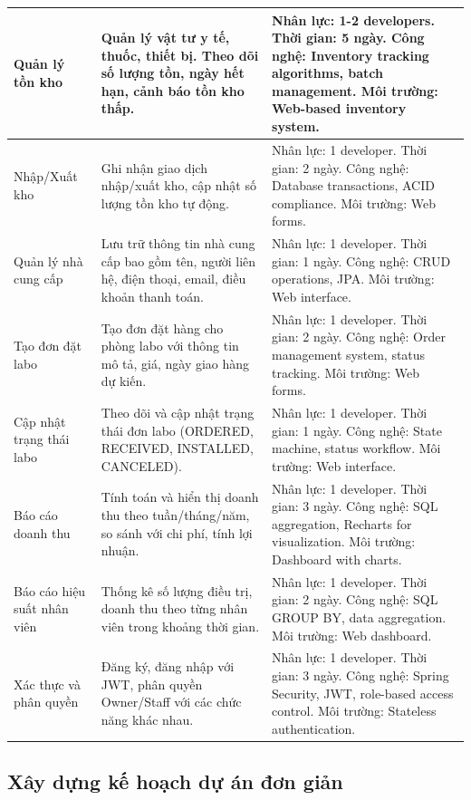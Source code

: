\begin{table}[h]
\begin{tabular}{|p{3.5cm}|p{5cm}|p{5cm}|}
\hline
Quản lý tồn kho & Quản lý vật tư y tế, thuốc, thiết bị. Theo dõi số lượng tồn, ngày hết hạn, cảnh báo tồn kho thấp. & Nhân lực: 1-2 developers. Thời gian: 5 ngày. Công nghệ: Inventory tracking algorithms, batch management. Môi trường: Web-based inventory system. \\
\hline
Nhập/Xuất kho & Ghi nhận giao dịch nhập/xuất kho, cập nhật số lượng tồn kho tự động. & Nhân lực: 1 developer. Thời gian: 2 ngày. Công nghệ: Database transactions, ACID compliance. Môi trường: Web forms. \\
\hline
Quản lý nhà cung cấp & Lưu trữ thông tin nhà cung cấp bao gồm tên, người liên hệ, điện thoại, email, điều khoản thanh toán. & Nhân lực: 1 developer. Thời gian: 1 ngày. Công nghệ: CRUD operations, JPA. Môi trường: Web interface. \\
\hline
Tạo đơn đặt labo & Tạo đơn đặt hàng cho phòng labo với thông tin mô tả, giá, ngày giao hàng dự kiến. & Nhân lực: 1 developer. Thời gian: 2 ngày. Công nghệ: Order management system, status tracking. Môi trường: Web forms. \\
\hline
Cập nhật trạng thái labo & Theo dõi và cập nhật trạng thái đơn labo (ORDERED, RECEIVED, INSTALLED, CANCELED). & Nhân lực: 1 developer. Thời gian: 1 ngày. Công nghệ: State machine, status workflow. Môi trường: Web interface. \\
\hline
Báo cáo doanh thu & Tính toán và hiển thị doanh thu theo tuần/tháng/năm, so sánh với chi phí, tính lợi nhuận. & Nhân lực: 1 developer. Thời gian: 3 ngày. Công nghệ: SQL aggregation, Recharts for visualization. Môi trường: Dashboard with charts. \\
\hline
Báo cáo hiệu suất nhân viên & Thống kê số lượng điều trị, doanh thu theo từng nhân viên trong khoảng thời gian. & Nhân lực: 1 developer. Thời gian: 2 ngày. Công nghệ: SQL GROUP BY, data aggregation. Môi trường: Web dashboard. \\
\hline
Xác thực và phân quyền & Đăng ký, đăng nhập với JWT, phân quyền Owner/Staff với các chức năng khác nhau. & Nhân lực: 1 developer. Thời gian: 3 ngày. Công nghệ: Spring Security, JWT, role-based access control. Môi trường: Stateless authentication. \\
\hline
\end{tabular}
\end{table}

\subsection{Xây dựng kế hoạch dự án đơn giản}

